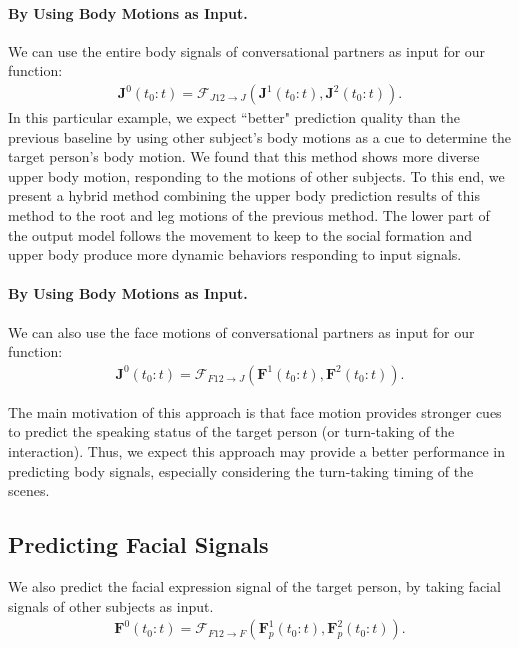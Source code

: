 \paragraph{By Using Body Motions as Input.} We can use the entire body signals of conversational partners as input for our function:
\begin{gather}	
\mathbf{J}^0 (t_0:t) = \mathcal{F}_{J12\rightarrow J} \left( \mathbf{J}^1 (t_0:t), \mathbf{J}^2 (t_0:t) \right) .
\end{gather}
In this particular example, we expect ``better" prediction quality than the previous baseline by using other subject's body motions as a cue to determine the target person's body motion. We found that this method shows more diverse upper body motion, responding to the motions of other subjects. To this end, we present a hybrid method combining the upper body prediction results of this method to the root and leg motions of the previous method. The lower part of the output model follows the movement to keep to the social formation and upper body produce more dynamic behaviors responding to input signals.

\paragraph{By Using Body Motions as Input.} We can also use the face motions of conversational partners as input for our function:
\begin{gather}	
\mathbf{J}^0 (t_0:t) = \mathcal{F}_{F12\rightarrow J} \left( \mathbf{F}^1 (t_0:t), \mathbf{F}^2 (t_0:t) \right) .
\end{gather}

The main motivation of this approach is that face motion provides stronger cues to predict the speaking status of the target person (or turn-taking of the interaction). Thus, we expect this approach may provide a better performance in predicting body signals, especially considering the turn-taking timing of the scenes. 

\subsection{Predicting Facial Signals}
We also predict the facial expression signal of the target person, by taking facial signals of other subjects as input. 
\begin{gather}	
\mathbf{F}^0(t_0:t) = \mathcal{F}_{F12\rightarrow F} \left( \mathbf{F}_p^1(t_0:t), \mathbf{F}_p^2(t_0:t) \right).
\end{gather}



